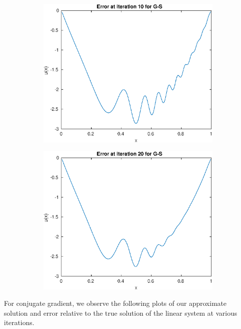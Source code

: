 \documentclass{article}
\begin{document}
\begin{figure}[H]
\begin{subfigure}{0.495\linewidth}
        \includegraphics[width=\linewidth]{GSerr_i=10.eps}
    \end{subfigure}
    \begin{subfigure}{0.495\linewidth}
        \centering
        \includegraphics[width=\linewidth]{GSerr_i=20.eps}
    \end{subfigure}
\end{figure}
For conjugate gradient, we observe the following plots of our approximate solution and error relative to the true solution of the linear system at various iterations.\\
\end{document}
